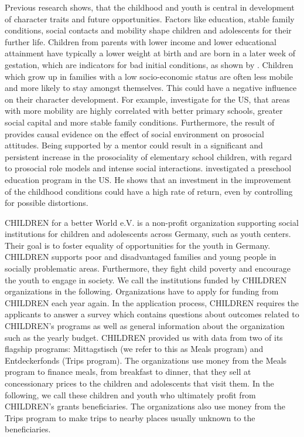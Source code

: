 \documentclass[12pt, a4paper, titlepage]{article}\usepackage[]{graphicx}\usepackage[]{color}
\begin{document}
Previous research shows, that the childhood and youth is central in development of character traits and future opportunities. Factors like education, stable family conditions, social contacts and mobility shape children and adolescents for their further life. Children from parents with lower income and lower educational attainment have typically a lower weight at birth and are born in a later week of gestation, which are indicators for bad initial conditions, as shown by \textcite{Case.2002}. Children which grow up in families with a low socio-economic status are often less mobile and more likely to stay amongst themselves. This could have a negative influence on their character development. For example, \textcite{Chetty.2014} investigate for the US, that areas with more mobility are highly correlated with better primary schools, greater social capital and more stable family conditions. Furthermore, the result of \textcite{Kosse.2020} provides causal evidence on the effect of social environment on prosocial attitudes. Being supported by a mentor could result in a significant and persistent increase in the prosociality of elementary school children, with regard to prosocial role models and intense social interactions. \textcite{Heckman.2010} investigated a preschool education program in the US. He shows that an investment in the improvement of the childhood conditions could have a high rate of return, even by controlling for possible distortions.   

CHILDREN for a better World e.V. is a non-profit organization supporting social institutions for children and adolescents across Germany, such as youth centers. Their goal is to foster equality of opportunities for the youth in Germany. CHILDREN supports poor and disadvantaged families and young people in socially problematic areas. Furthermore, they fight child poverty and encourage the youth to engage in society. We call the institutions funded by CHILDREN organizations in the following. Organizations have to apply for funding from CHILDREN each year again. In the application process, CHILDREN requires the applicants to answer a survey which contains questions about outcomes related to CHILDREN’s programs as well as general information about the organization such as the yearly budget.
CHILDREN provided us with data from two of its flagship programs: Mittagstisch (we refer to this as Meals program) and Entdeckerfonds (Trips program). The organizations use money from the Meals program to finance meals, from breakfast to dinner, that they sell at concessionary prices to the children and adolescents that visit them. In the following, we call these children and youth who ultimately profit from CHILDREN's grants beneficiaries. The organizations also use money from the Trips program to make trips to nearby places usually unknown to the beneficiaries.  
\end{document}
